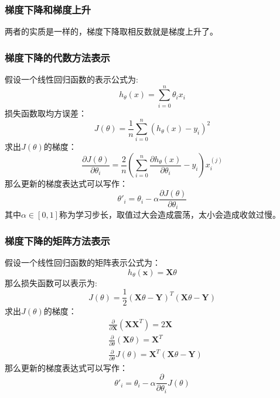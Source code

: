 \documentclass[11pt]{report}
\begin{document}
\subsubsection{梯度下降和梯度上升}
两者的实质是一样的，梯度下降取相反数就是梯度上升了。
\subsubsection{梯度下降的代数方法表示}
假设一个线性回归函数的表示公式为:
\begin{equation}
	h_\theta(x)=\sum_{i=0}^n\theta_i x_i
\end{equation}
损失函数取均方误差：
\begin{equation}
	J(\theta)=\frac{1}{n}\sum_{i=0}^n(h_\theta(x)-y_i)^2
\end{equation}
求出$J(\theta)$的梯度：
\begin{equation}
	\frac{\partial J(\theta)}{\partial \theta_i}=\frac{2}{n}\left(\sum_{i=0}^n\frac{\partial h_\theta(x)}{\partial \theta_i}-y_i\right)x_i^{(j)}
\end{equation}
那么更新的梯度表达式可以写作：
\begin{equation}
	\theta'_i=\theta_i-\alpha\frac{\partial J(\theta)}{\partial \theta_i}
\end{equation}
其中$\alpha\in[0,1]$称为学习步长，取值过大会造成震荡，太小会造成收敛过慢。
\subsubsection{梯度下降的矩阵方法表示}
假设一个线性回归函数的矩阵表示公式为：
\begin{equation}
	h_\theta(\textbf{x})=\textbf{X}\theta
\end{equation}
那么损失函数可以表示为:
\begin{equation}
	J(\theta)=\frac{1}{2}(\textbf{X}\theta-\textbf{Y})^T(\textbf{X}\theta-\textbf{Y})
\end{equation}
求出$J(\theta)$的梯度：
\begin{equation}
\begin{split}
	&\frac{\partial}{\partial\textbf{X}}(\textbf{X}\textbf{X}^T)=2\textbf{X}\\
	&\frac{\partial}{\partial\theta}(\textbf{X}\theta)=\textbf{X}^T\\
	&\frac{\partial}{\partial\theta}J(\theta)=\textbf{X}^T(\textbf{X}\theta-\textbf{Y})
\end{split}
\end{equation}
那么更新的梯度表达式可以写作：
\begin{equation}
	\theta'_i=\theta_i-\alpha\frac{\partial}{\partial \theta_i}J(\theta)
\end{equation}
\end{document}
